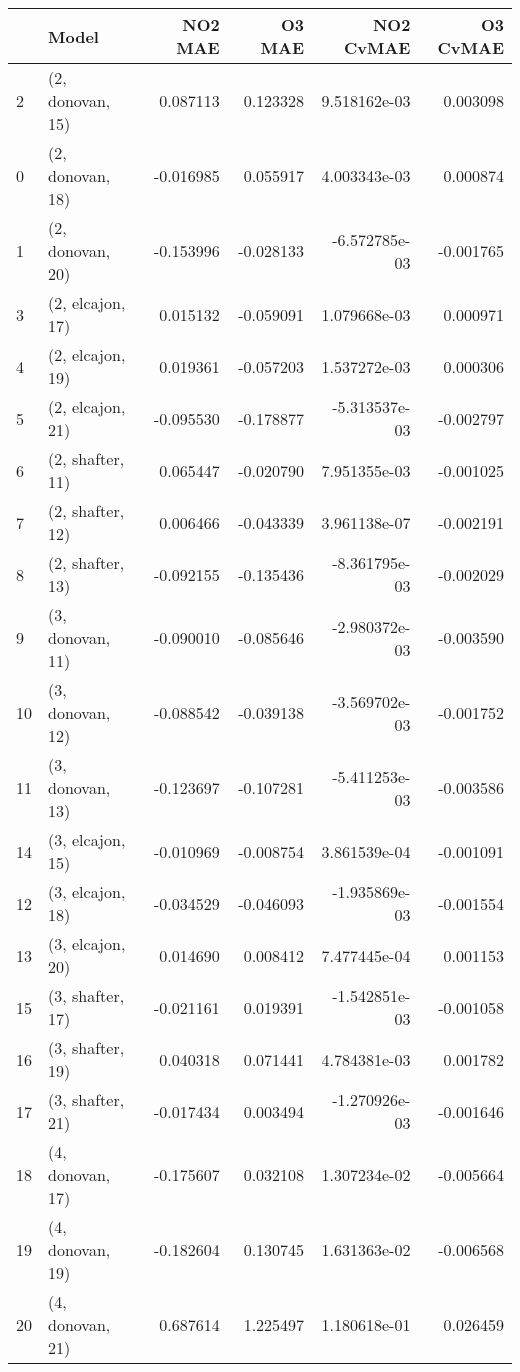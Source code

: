\begin{tabular}{llrrrr}
\toprule
{} &             Model &   NO2 MAE &    O3 MAE &     NO2 CvMAE &  O3 CvMAE \\
\midrule
2  &  (2, donovan, 15) &  0.087113 &  0.123328 &  9.518162e-03 &  0.003098 \\
0  &  (2, donovan, 18) & -0.016985 &  0.055917 &  4.003343e-03 &  0.000874 \\
1  &  (2, donovan, 20) & -0.153996 & -0.028133 & -6.572785e-03 & -0.001765 \\
3  &  (2, elcajon, 17) &  0.015132 & -0.059091 &  1.079668e-03 &  0.000971 \\
4  &  (2, elcajon, 19) &  0.019361 & -0.057203 &  1.537272e-03 &  0.000306 \\
5  &  (2, elcajon, 21) & -0.095530 & -0.178877 & -5.313537e-03 & -0.002797 \\
6  &  (2, shafter, 11) &  0.065447 & -0.020790 &  7.951355e-03 & -0.001025 \\
7  &  (2, shafter, 12) &  0.006466 & -0.043339 &  3.961138e-07 & -0.002191 \\
8  &  (2, shafter, 13) & -0.092155 & -0.135436 & -8.361795e-03 & -0.002029 \\
9  &  (3, donovan, 11) & -0.090010 & -0.085646 & -2.980372e-03 & -0.003590 \\
10 &  (3, donovan, 12) & -0.088542 & -0.039138 & -3.569702e-03 & -0.001752 \\
11 &  (3, donovan, 13) & -0.123697 & -0.107281 & -5.411253e-03 & -0.003586 \\
14 &  (3, elcajon, 15) & -0.010969 & -0.008754 &  3.861539e-04 & -0.001091 \\
12 &  (3, elcajon, 18) & -0.034529 & -0.046093 & -1.935869e-03 & -0.001554 \\
13 &  (3, elcajon, 20) &  0.014690 &  0.008412 &  7.477445e-04 &  0.001153 \\
15 &  (3, shafter, 17) & -0.021161 &  0.019391 & -1.542851e-03 & -0.001058 \\
16 &  (3, shafter, 19) &  0.040318 &  0.071441 &  4.784381e-03 &  0.001782 \\
17 &  (3, shafter, 21) & -0.017434 &  0.003494 & -1.270926e-03 & -0.001646 \\
18 &  (4, donovan, 17) & -0.175607 &  0.032108 &  1.307234e-02 & -0.005664 \\
19 &  (4, donovan, 19) & -0.182604 &  0.130745 &  1.631363e-02 & -0.006568 \\
20 &  (4, donovan, 21) &  0.687614 &  1.225497 &  1.180618e-01 &  0.026459 \\

\end{tabular}
